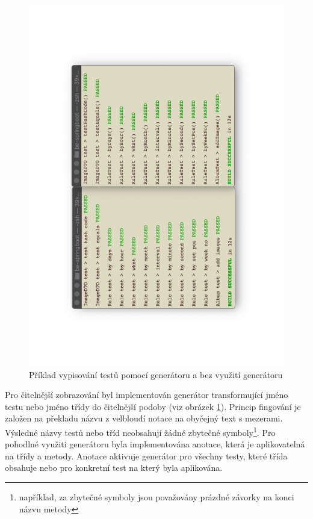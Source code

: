     \begin{figure}\centering
	   \includegraphics[angle=-90, width=1.0\textwidth]{pdfs/pretty-tests-comparison}
	   \caption[Srovnaní zobrazováni kódu]{Příklad vypisování testů pomocí generátoru a bez využití generátoru}\label{image:pretty-tests-comparison}
    \end{figure}
    Pro čitelnější zobrazování byl implementován generátor transformující jméno testu nebo jméno třídy do čitelnější podoby (viz obrázek \ref{image:pretty-tests-comparison}). Princip fingování je založen na překladu názvu z velbloudí notace na obyčejný text s mezerami. Výsledné názvy testů nebo tříd neobsahují žádné zbytečné symboly\footnote{například, za zbytečné symboly jsou považovány prázdné závorky na konci názvu metody}. Pro pohodlné využiti generátoru byla implementována anotace, která je aplikovatelná na třídy a metody. Anotace aktivuje generátor pro všechny testy, které třída obsahuje nebo pro konkretní test na který byla aplikována.
    
